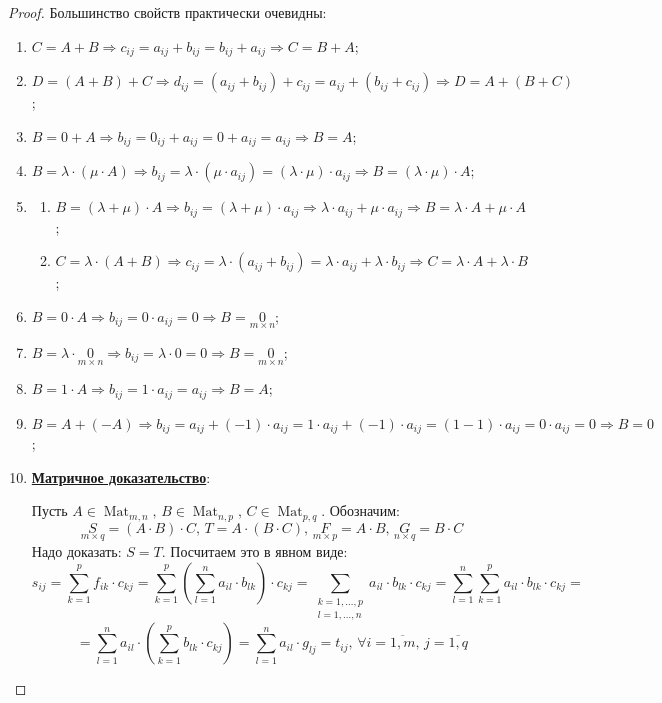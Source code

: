 \documentclass[12pt]{article}
\theoremstyle{definition}
\newcommand{\ddsum}[2]{\displaystyle\sum\limits_{#1}^{#2}}
\newcommand{\mat}[2]{\operatorname{Mat}_{#1, #2}}
\begin{document}
\begin{proof}
	Большинство свойств практически очевидны:
	\begin{enumerate}[label=(\arabic*)]
		\item $C = A + B \Rightarrow  c_{ij} = a_{ij} + b_{ij} = b_{ij} + a_{ij} \Rightarrow C = B+A$;
		\item $D = (A + B) + C \Rightarrow d_{ij}= (a_{ij} + b_{ij}) + c_{ij} = a_{ij} + (b_{ij} + c_{ij}) \Rightarrow D = A + (B + C)$;
		\item $B = 0 + A \Rightarrow b_{ij} = 0_{ij} + a_{ij} = 0 + a_{ij} = a_{ij} \Rightarrow B = A$;
		\item $B = \lambda{\cdot}(\mu{\cdot}A) \Rightarrow b_{ij} = \lambda{\cdot}(\mu{\cdot}a_{ij}) = (\lambda{\cdot}\mu){\cdot}a_{ij} \Rightarrow B = (\lambda{\cdot}\mu){\cdot}A$;
		\item \hfill
		\begin{enumerate}[label=(\alph*)]
			\item $B = (\lambda + \mu){\cdot}A \Rightarrow b_{ij} = (\lambda + \mu){\cdot}a_{ij} \Rightarrow \lambda{\cdot}a_{ij} + \mu{\cdot}a_{ij} \Rightarrow B = \lambda{\cdot}A + \mu{\cdot}A$;
			\item $C = \lambda{\cdot}(A + B) \Rightarrow c_{ij} = \lambda{\cdot}(a_{ij} + b_{ij}) = \lambda{\cdot}a_{ij} + \lambda{\cdot}b_{ij} \Rightarrow C = \lambda{\cdot}A + \lambda{\cdot}B$;
		\end{enumerate}
		\item $B = 0{\cdot}A \Rightarrow b_{ij} = 0{\cdot}a_{ij} = 0 \Rightarrow B = \underset{m \times n}{0}$;
		\item $B = \lambda{\cdot}\underset{m \times n}{0} \Rightarrow b_{ij} = \lambda{\cdot}0 = 0 \Rightarrow B = \underset{m\times n}{0}$;
		\item $B = 1{\cdot}A \Rightarrow b_{ij} = 1{\cdot}a_{ij} = a_{ij} \Rightarrow B = A$;
		\item $B = A +(-A) \Rightarrow b_{ij} = a_{ij} + (-1){\cdot}a_{ij}= 1{\cdot}a_{ij} + (-1){\cdot}a_{ij} = (1 -1){\cdot}a_{ij} = 0{\cdot}a_{ij} = 0 \Rightarrow B = 0$;
		\item \uline{\textbf{Матричное доказательство}}:
		
		Пусть $A \in \mat{m}{n}, \, B \in \mat{n}{p}, \, C \in \mat{p}{q}$. Обозначим: 
		$$
			\underset{m\times q}{S} = (A{\cdot}B){\cdot}C, \, T = A{\cdot}(B{\cdot}C), \, \underset{m\times p}{F} = A{\cdot}B, \, \underset{n \times q}{G} = B{\cdot}C
		$$
		Надо доказать: $S = T$. Посчитаем это в явном виде:
		$$
			s_{ij} = \ddsum{k = 1}{p}f_{ik}{\cdot}c_{kj} = \ddsum{k = 1}{p}\left(\ddsum{l = 1}{n}a_{il}{\cdot}b_{lk}\right)\!\!{\cdot}c_{kj} = \ddsum{\substack{k = 1,\dotsc,p\\l = 1,\dotsc, n}}{}a_{il}{\cdot}b_{lk}{\cdot}c_{kj} = \ddsum{l =  1}{n}\ddsum{k = 1}{p}a_{il}{\cdot}b_{lk}{\cdot}c_{kj} = 
		$$
		$$
			= \ddsum{l = 1}{n}a_{il}{\cdot}\!\!\left(\ddsum{k = 1}{p}b_{lk}{\cdot}c_{kj}\right) = \ddsum{l = 1}{n}a_{il}{\cdot}g_{lj} = t_{ij}, \,\forall i = \overline{1,m}, \, j = \overline{1,q}
		$$
		

\end{enumerate}
\end{proof}
\end{document}
